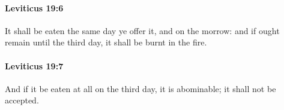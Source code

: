 		\paragraph{Leviticus 19:6} %
			\label{LEVITICUS-19-6}

			It shall be eaten the same day ye offer it, and on the morrow: and if ought remain until the third day, it shall be burnt in the fire.


		\paragraph{Leviticus 19:7} %
			\label{LEVITICUS-19-7}

			And if it be eaten at all on the third day, it is abominable; it shall not be accepted.


